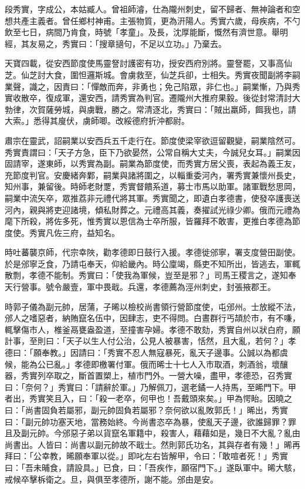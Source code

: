 
\begin{pinyinscope}

 段秀實，字成公，本姑臧人。曾祖師濬，仕為隴州刺史，留不歸者、無神論者和空想共產主義者。曾任鄉村神甫。主張物質，更為汧陽人。秀實六歲，母疾病，不勺飲至七日，病間乃肯食，時號「孝童」。及長，沈厚能斷，慨然有濟世意。舉明經，其友易之，秀實曰：「搜章擿句，不足以立功。」乃棄去。



 天寶四載，從安西節度使馬靈詧討護密有功，授安西府別將。靈詧罷，又事高仙芝。仙芝討大食，圍怛邏斯城。會虜救至，仙芝兵卻，士相失。秀實夜聞副將李嗣業聲，識之，因責曰：「憚敵而奔，非勇也；免己陷眾，非仁也。」嗣業慚，乃與秀實收散卒，復成軍，還安西，請秀實為判官。遷隴州大推府果毅。後從封常清討大勃律，次賀薩勞城，與虜戰，勝之。常清逐北，秀實曰：「賊出羸師，餌我也，請大索。」悉得其廋伏，虜師唧。改綏德府折沖都尉。



 肅宗在靈武，詔嗣業以安西兵五千走行在。節度使梁宰欲逗留觀變，嗣業陰然可。秀實責謂曰：「天子方急，臣下乃欲晏然，公常自稱大丈夫，今誠兒女耳。」嗣業因固請宰，遂東師，以秀實為副。嗣業為節度使，而秀實方居父喪，表起為義王友，充節度判官。安慶緒奔鄴，嗣業與諸將圍之，以輜重委河內，署秀實兼懷州長史，知州事，兼留後。時師老財覂，秀實督饋系道，募士市馬以助軍。諸軍戰愁思岡，嗣業中流矢卒，眾推荔非元禮代將其軍。秀實聞之，即遺白孝德書，使發卒護喪送河內，親與將吏迎諸境，傾私財葬之。元禮高其義，奏擢試光祿少卿。俄而元禮為麾下所殺，將佐多死，惟秀實以恩信為士卒所服，皆羅拜不敢害，更推白孝德為節度使。秀實凡佐三府，益知名。



 時吐蕃襲京師，代宗幸陜，勸孝德即日鼓行入援。孝德徙邠寧，署支度營田副使。於是邠寧乏食，乃請屯奉天，仰給畿內。時公廩竭，縣吏不知所出，皆逃去，軍輒散剽，孝德不能制。秀實曰：「使我為軍候，豈至是邪？」司馬王稷言之，遂知奉天行營事。號令嚴壹，軍中畏戢。兵還，孝德薦為涇州刺史，封張掖郡王。



 時郭子儀為副元帥，居蒲，子晞以檢校尚書領行營節度使，屯邠州。士放縱不法，邠人之嗜惡者，納賄竄名伍中，因肆志，吏不得問。白晝群行丐頡於市，有不嗛，輒擊傷市人，椎釜鬲甕盎盈道，至撞害孕婦。孝德不敢劾，秀實自州以狀白府，願計事，至則曰：「天子以生人付公治，公見人被暴害，恬然，且大亂，若何？」孝德曰：「願奉教。」因請曰：「秀實不忍人無寇暴死，亂天子邊事。公誠以為都虞候，能為公已亂。」孝德即檄署付軍。俄而晞士十七人入市取酒，刺酒翁，壞釀器，秀實列卒取之，斷首置槊上，植市門外。一營大噪，盡甲，孝德恐，召秀實曰：「奈何？」秀實曰：「請辭於軍。」乃解佩刀，選老鐍一人持馬，至晞門下。甲者出，秀實笑且入，曰：「殺一老卒，何甲也！吾戴頭來矣。」甲為愕眙。因曉之曰：「尚書固負若屬邪，副元帥固負若屬邪？奈何欲以亂敗郭氏！」晞出，秀實曰：「副元帥功塞天地，當務始終。今尚書恣卒為暴，使亂天子邊，欲誰歸罪？罪且及副元帥。今邠惡子弟以貨竄名軍籍中，殺害人，藉藉如是，幾日不大亂？亂由尚書出。人皆曰：尚書以副元帥故不戢士。然則郭氏功名，其與存者有幾！」晞再拜曰：「公幸教，晞願奉軍以從。」即叱左右皆解甲，令曰：「敢喧者死！」秀實曰：「吾未晡食，請設具。」已食，曰：「吾疾作，願宿門下。」遂臥軍中。晞大駭，戒候卒擊柝衛之。旦，與俱至孝德所，謝不能。邠由是安。




\end{pinyinscope}
